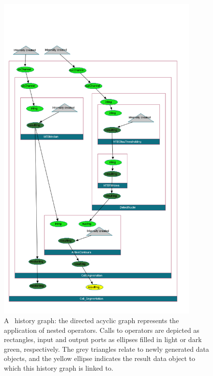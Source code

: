 \begin{center}
\begin{figure}
\vspace*{-0.85cm}
\centerline{\includegraphics[clip, trim= 0 0 20 110, width=0.9\textwidth]{../images/exampleDAG.png}}
\vspace*{-0.85cm}
\caption[Example of a history graph.]{\label{fig:DAG}
A \mitobo\ history graph: the directed acyclic graph represents the application of nested operators. 
Calls to operators are depicted as rectangles, input and output ports as ellipses filled in light or dark green,
respectively. 
The grey triangles relate to newly generated data objects, and the yellow ellipse indicates the result data object
to which this history graph is linked to.}
\end{figure}
\end{center}


